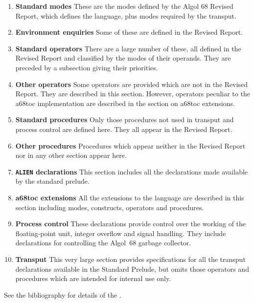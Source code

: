 \begin{enumerate}
\item \textbf{Standard modes} \newline
These are the modes defined by the Algol 68 Revised Report, which
defines the language, plus modes required by the transput.
\item \textbf{Environment enquiries} \newline
Some of these are defined in the Revised Report.
\item \textbf{Standard operators} \newline
There are a large number of these, all defined in the Revised Report
and classified by the modes of their operands. They are preceded by a
subsection giving their priorities.
\item\textbf{Other operators} \newline
Some operators are provided which are not in the Revised Report. They
are described in this section. However, operators peculiar to the
a68toc implementation are described in the section on a68toc
extensions.
\item \textbf{Standard procedures} \newline
Only those procedures not used in transput and process control are
defined here. They all appear in the Revised Report.
\item \textbf{Other procedures} \newline
Procedures which appear neither in the Revised Report nor in any other
section appear here.
\item \textbf{\texttt{ALIEN} declarations}
This section includes all the  declarations made
available by the standard prelude.
\item \textbf{a68toc extensions}\newline
All the extensions to the language are described in this section
including modes, constructs, operators and procedures.
\item \textbf{Process control} \newline
These declarations provide control over the working of the
floating-point unit, integer overflow and signal handling. They include
declarations for controlling the Algol~68 garbage collector.
\item \textbf{Transput} \newline
This very large section provides specifications for all the transput
declarations available in the Standard Prelude, but omits those
operators and procedures which are intended for internal use only.
\end{enumerate}
See the bibliography for details of the .

